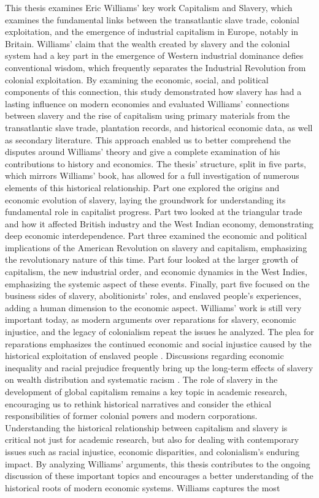 This thesis examines Eric Williams' key work Capitalism and Slavery, which examines the fundamental links between the transatlantic slave trade, colonial exploitation, and the emergence of industrial capitalism in Europe, notably in Britain. Williams' claim that the wealth created by slavery and the colonial system had a key part in the emergence of Western industrial dominance defies conventional wisdom, which frequently separates the Industrial Revolution from colonial exploitation. By examining the economic, social, and political components of this connection, this study demonstrated how slavery has had a lasting influence on modern economies and evaluated Williams' connections between slavery and the rise of capitalism using primary materials from the transatlantic slave trade, plantation records, and historical economic data, as well as secondary literature. This approach enabled us to better comprehend the disputes around Williams' theory and give a complete examination of his contributions to history and economics. The thesis' structure, split in five parts, which mirrors Williams' book, has allowed for a full investigation of numerous elements of this historical relationship. Part one explored the origins and economic evolution of slavery, laying the groundwork for understanding its fundamental role in capitalist progress. Part two looked at the triangular trade and how it affected British industry and the West Indian economy, demonstrating deep economic interdependence. Part three examined the economic and political implications of the American Revolution on slavery and capitalism, emphasizing the revolutionary nature of this time. Part four looked at the larger growth of capitalism, the new industrial order, and economic dynamics in the West Indies, emphasizing the systemic aspect of these events. Finally, part five focused on the business sides of slavery, abolitionists' roles, and enslaved people's experiences, adding a human dimension to the economic aspect. Williams' work is still very important today, as modern arguments over reparations for slavery, economic injustice, and the legacy of colonialism repeat the issues he analyzed. The plea for reparations emphasizes the continued economic and social injustice caused by the historical exploitation of enslaved people . Discussions regarding economic inequality and racial prejudice frequently bring up the long-term effects of slavery on wealth distribution and systematic racism . The role of slavery in the development of global capitalism remains a key topic in academic research, encouraging us to rethink historical narratives and consider the ethical responsibilities of former colonial powers and modern corporations. Understanding the historical relationship between capitalism and slavery is critical not just for academic research, but also for dealing with contemporary issues such as racial injustice, economic disparities, and colonialism's enduring impact. By analyzing Williams' arguments, this thesis contributes to the ongoing discussion of these important topics and encourages a better understanding of the historical roots of modern economic systems. Williams captures the most 